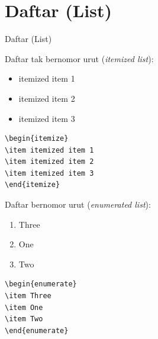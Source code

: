 \documentclass[11pt,            %
               aspectratio=169, %
               xcolor=svgnames,
               t                %
               ]{beamer}
\begin{document}
\section{Daftar (List)}
\begin{frame}{Daftar (List)}
\label{list}

Daftar tak bernomor urut (\textit{itemized list}):

\begin{itemize}
\item itemized item 1
\item itemized item 2
\item itemized item 3
\end{itemize}

\begin{block}{}
\begin{verbatim}
\begin{itemize}
\item itemized item 1
\item itemized item 2
\item itemized item 3
\end{itemize}
\end{verbatim}
\end{block}
\newpage
Daftar bernomor urut (\textit{enumerated list}):

\begin{enumerate}
\item Three
\item One
\item Two
\end{enumerate}

\begin{block}{}
\begin{verbatim}
\begin{enumerate}
\item Three
\item One
\item Two
\end{enumerate}
\end{verbatim}
\end{block}

\end{frame}
\end{document}

